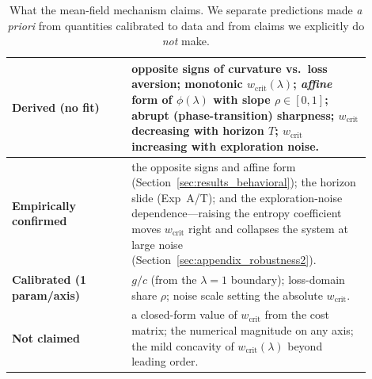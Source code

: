 \documentclass[letterpaper]{article}
\theoremstyle{plain}
\newcommand{\wcrit}{w_{\mathrm{crit}}}
\begin{document}
\begin{table}[tb]
\centering
\caption{What the mean-field mechanism claims. We separate predictions made
\emph{a priori} from quantities calibrated to data and from claims we
explicitly do \emph{not} make.}
\label{tab:ledger}
\small
\begin{tabular}{p{0.30\linewidth}p{0.60\linewidth}}
\toprule
\textbf{Derived (no fit)} & opposite signs of curvature vs.\ loss aversion;
monotonic $\wcrit(\lambda)$; \emph{affine} form of $\phi(\lambda)$ with
slope $\rho\in[0,1]$; abrupt (phase-transition) sharpness; $\wcrit$
decreasing with horizon $T$; $\wcrit$ increasing with exploration noise. \\
\midrule
\textbf{Empirically confirmed} & the opposite signs and affine form
(Section~\ref{sec:results_behavioral}); the horizon slide (Exp~A/T); and the
exploration-noise dependence---raising the entropy coefficient moves
$\wcrit$ right and collapses the system at large noise
(Section~\ref{sec:appendix_robustness2}). \\
\midrule
\textbf{Calibrated (1 param/axis)} & $g/c$ (from the $\lambda{=}1$
boundary); loss-domain share $\rho$; noise scale setting the absolute
$\wcrit$. \\
\midrule
\textbf{Not claimed} & a closed-form value of $\wcrit$ from the cost matrix;
the numerical magnitude on any axis; the mild concavity of $\wcrit(\lambda)$
beyond leading order. \\
\bottomrule
\end{tabular}
\end{table}
\end{document}
